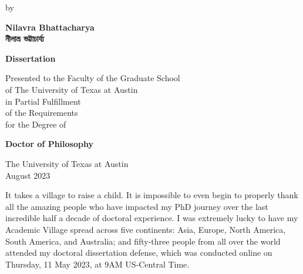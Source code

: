 \documentclass[letterpaper, nobind]{templates/ociamthesis}
\begin{document}
\begin{romanpages}
\begin{center}
  \vspace*{24pt}

  \begin{spacing}{1.4}
    by\\
    
    \vspace*{24pt}
    
    {\Large{\textbf{
      Nilavra Bhattacharya\\
      \vspace*{10pt}
      {\Huge {\secondlanguage নীলাভ্র ভট্টাচার্য্য}}
    }}}
    
    \vspace*{72pt}
    
    {\Large{\textbf{Dissertation}}}\\
    
    \vspace*{24pt}
    
    Presented to the Faculty of the Graduate School\\
    of The University of Texas at Austin\\
    in Partial Fulfillment\\
    of the Requirements\\
    for the Degree of\\
    
    \vspace*{30pt}
    
    {\Large{\textbf{Doctor of Philosophy}}}\\
    
    \vfill

    {\large{The University of Texas at Austin\\
    August 2023}}

  \end{spacing}
\end{center}







\begin{acknowledgements}
 	It takes a village to raise a child.
 It is impossible to even begin to properly thank all the amazing people who have impacted my PhD journey over the last incredible half a decade of doctoral experience.
 I was extremely lucky to have my Academic Village spread across five continents: Asia, Europe, North America, South America, and Australia; and fifty-three people from all over the world attended my doctoral dissertation defense, which was conducted online on Thursday, 11 May 2023, at 9AM US-Central Time.


\end{acknowledgements}
\end{romanpages}
\end{document}
